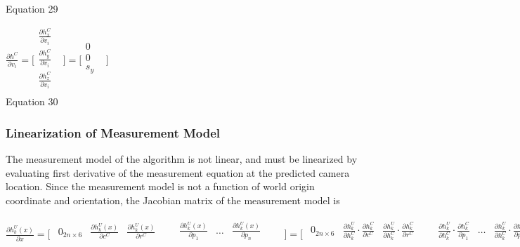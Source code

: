 Equation 29



$\frac{\partial h^{C}}{\partial v_{i}}=\lbrack \begin{matrix}
\frac{\partial h_{x}^{C}}{\partial v_{i}} & \\
\frac{\partial h_{y}^{C}}{\partial v_{i}} & \\
\frac{\partial h_{z}^{C}}{\partial v_{i}} & \\
\end{matrix}
\rbrack =\lbrack \begin{matrix}
0 & \\
0 & \\
s_{y} & \\
\end{matrix}
\rbrack $\\


Equation 30



\subsubsection{Linearization of Measurement Model}
The measurement model of the algorithm is not linear, and must be 
linearized by evaluating first derivative of the measurement equation at 
the predicted camera location. Since the measurement model is not a 
function of world origin coordinate and orientation, the Jacobian matrix 
of the measurement model is\ \ \ \ 

$\frac{\partial h_{k}^{U}(x)}{\partial x}=\lbrack \begin{matrix}
\begin{matrix}
0_{2n\times 6} & \frac{\partial h_{k}^{U}(x)}{\partial c^{C}} & 
\frac{\partial h_{k}^{U}(x)}{\partial r^{C}} & \\
\end{matrix}
 & \begin{matrix}
\frac{\partial h_{k}^{U}(x)}{\partial p_{1}} & \ldots & \frac{\partial 
h_{k}^{U}(x)}{\partial p_{n}} & \\
\end{matrix}
 & \\
\end{matrix}
\rbrack =\lbrack \begin{matrix}
\begin{matrix}
0_{2n\times 6} & \frac{\partial h_{k}^{U}}{\partial h_{k}^{C}}\cdot 
\frac{\partial h_{k}^{C}}{\partial c^{C}} & \frac{\partial 
h_{k}^{U}}{\partial h_{k}^{C}}\cdot \frac{\partial h_{k}^{C}}{\partial 
r^{C}} & \\
\end{matrix}
 & \begin{matrix}
\frac{\partial h_{k}^{U}}{\partial h_{k}^{C}}\cdot \frac{\partial 
h_{k}^{C}}{\partial p_{1}} & \ldots & \frac{\partial h_{k}^{U}}{\partial 
h_{k}^{C}}\cdot \frac{\partial h_{k}^{C}}{\partial p_{n}} & \\
\end{matrix}
 & \\
\end{matrix}
\rbrack $\\


